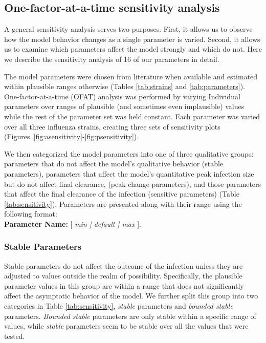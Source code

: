 \documentclass[preprint,10pt,authoryear]{article}
\begin{document}
\subsection{One-factor-at-a-time sensitivity analysis}

A general sensitivity analysis serves two purposes.  First, it allows us to observe how the model behavior changes as a single parameter is varied.  Second, it allows us to examine which parameters affect the model strongly and which do not.  Here we describe the sensitivity analysis of 16 of our parameters in detail.

The model parameters were chosen from literature when available and estimated within plausible ranges otherwise (Tables \ref{tab:strains} and \ref{tab:parameters}).  One-factor-at-a-time (OFAT) analysis was performed by varying Individual parameters over ranges of plausible (and sometimes even implausible) values while the rest of the parameter set was held constant.  Each parameter was varied over all three influenza strains, creating three sets of sensitivity plots (Figures~\ref{fig:asensitivity}-\ref{fig:psensitivity}).

We then categorized the model parameters into one of three qualitative groups: parameters that do not affect the model's qualitative behavior (stable parameters), parameters that affect the model's quantitative peak infection size but do not affect final clearance, (peak change parameters), and those parameters that affect the final clearance of the infection (sensitive parameters) (Table \ref{tab:sensitivity}).  Parameters are presented along with their range using the following format:  \\

\textbf{Parameter Name:} [ \textit{min | default | max} ].


\subsubsection{Stable Parameters}

Stable parameters do not affect the outcome of the infection unless they are adjusted to values outside the realm of possibility.  Specifically, the plausible parameter values in this group are within a range that does not significantly affect the asymptotic behavior of the model.  We further split this group into two categories in Table \ref{tab:sensitivity}, \textit{stable} parameters and \textit{bounded stable} parameters.  \textit{Bounded stable} parameters are only stable within a specific range of values, while \textit{stable} parameters seem to be stable over all the values that were tested.
\end{document}
